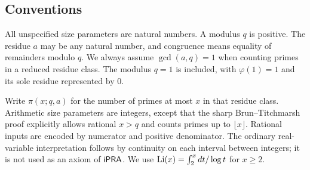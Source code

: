 \subsection{Conventions}

All unspecified size parameters are natural numbers. A modulus $q$ is positive. The residue $a$ may be any natural number, and congruence means equality of remainders modulo $q$. We always assume $\gcd(a,q)=1$ when counting primes in a reduced residue class. The modulus $q=1$ is included, with $\varphi(1)=1$ and its sole residue represented by $0$.

Write $\pi(x;q,a)$ for the number of primes at most $x$ in that residue class. Arithmetic size parameters are integers, except that the sharp Brun--Titchmarsh proof explicitly allows rational $x>q$ and counts primes up to $\lfloor x\rfloor$. Rational inputs are encoded by numerator and positive denominator. The ordinary real-variable interpretation follows by continuity on each interval between integers; it is not used as an axiom of $\mathsf{iPRA}$. We use $\operatorname{Li}(x)=\int_2^x dt/\log t$ for $x\geq2$.
